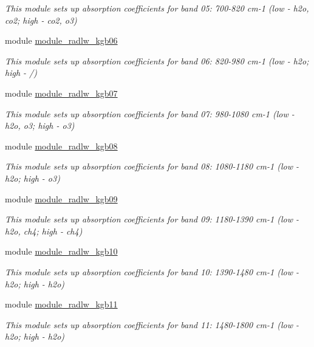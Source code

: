\begin{DoxyCompactItemize}
\begin{DoxyCompactList}\small\item\em This module sets up absorption coefficients for band 05\+: 700-\/820 cm-\/1 (low -\/ h2o, co2; high -\/ co2, o3) \end{DoxyCompactList}\item 
module \hyperlink{namespacemodule__radlw__kgb06}{module\+\_\+radlw\+\_\+kgb06}
\begin{DoxyCompactList}\small\item\em This module sets up absorption coefficients for band 06\+: 820-\/980 cm-\/1 (low -\/ h2o; high -\/ /) \end{DoxyCompactList}\item 
module \hyperlink{namespacemodule__radlw__kgb07}{module\+\_\+radlw\+\_\+kgb07}
\begin{DoxyCompactList}\small\item\em This module sets up absorption coefficients for band 07\+: 980-\/1080 cm-\/1 (low -\/ h2o, o3; high -\/ o3) \end{DoxyCompactList}\item 
module \hyperlink{namespacemodule__radlw__kgb08}{module\+\_\+radlw\+\_\+kgb08}
\begin{DoxyCompactList}\small\item\em This module sets up absorption coefficients for band 08\+: 1080-\/1180 cm-\/1 (low -\/ h2o; high -\/ o3) \end{DoxyCompactList}\item 
module \hyperlink{namespacemodule__radlw__kgb09}{module\+\_\+radlw\+\_\+kgb09}
\begin{DoxyCompactList}\small\item\em This module sets up absorption coefficients for band 09\+: 1180-\/1390 cm-\/1 (low -\/ h2o, ch4; high -\/ ch4) \end{DoxyCompactList}\item 
module \hyperlink{namespacemodule__radlw__kgb10}{module\+\_\+radlw\+\_\+kgb10}
\begin{DoxyCompactList}\small\item\em This module sets up absorption coefficients for band 10\+: 1390-\/1480 cm-\/1 (low -\/ h2o; high -\/ h2o) \end{DoxyCompactList}\item 
module \hyperlink{namespacemodule__radlw__kgb11}{module\+\_\+radlw\+\_\+kgb11}
\begin{DoxyCompactList}\small\item\em This module sets up absorption coefficients for band 11\+: 1480-\/1800 cm-\/1 (low -\/ h2o; high -\/ h2o) \end{DoxyCompactList}\item 

\end{DoxyCompactItemize}
